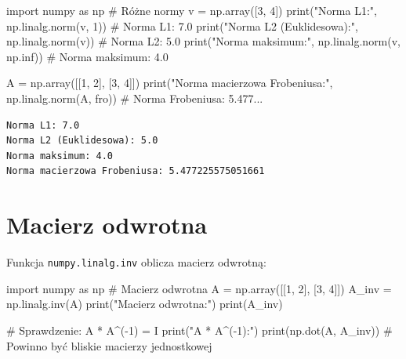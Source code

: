 \documentclass[
  letterpaper,
  DIV=11,
  numbers=noendperiod]{scrreprt}
\newenvironment{Shaded}{\begin{snugshade}}{\end{snugshade}}
\newcommand{\BuiltInTok}[1]{\textcolor[rgb]{0.00,0.23,0.31}{#1}}
\newcommand{\CommentTok}[1]{\textcolor[rgb]{0.37,0.37,0.37}{#1}}
\newcommand{\DecValTok}[1]{\textcolor[rgb]{0.68,0.00,0.00}{#1}}
\newcommand{\ImportTok}[1]{\textcolor[rgb]{0.00,0.46,0.62}{#1}}
\newcommand{\NormalTok}[1]{\textcolor[rgb]{0.00,0.23,0.31}{#1}}
\newcommand{\OperatorTok}[1]{\textcolor[rgb]{0.37,0.37,0.37}{#1}}
\newcommand{\StringTok}[1]{\textcolor[rgb]{0.13,0.47,0.30}{#1}}
\begin{document}
\begin{Shaded}
\begin{Highlighting}[]
\ImportTok{import}\NormalTok{ numpy }\ImportTok{as}\NormalTok{ np}
\CommentTok{\# Różne normy}
\NormalTok{v }\OperatorTok{=}\NormalTok{ np.array([}\DecValTok{3}\NormalTok{, }\DecValTok{4}\NormalTok{])}
\BuiltInTok{print}\NormalTok{(}\StringTok{"Norma L1:"}\NormalTok{, np.linalg.norm(v, }\DecValTok{1}\NormalTok{))  }\CommentTok{\# Norma L1: 7.0}
\BuiltInTok{print}\NormalTok{(}\StringTok{"Norma L2 (Euklidesowa):"}\NormalTok{, np.linalg.norm(v))  }\CommentTok{\# Norma L2: 5.0}
\BuiltInTok{print}\NormalTok{(}\StringTok{"Norma maksimum:"}\NormalTok{, np.linalg.norm(v, np.inf))  }\CommentTok{\# Norma maksimum: 4.0}

\NormalTok{A }\OperatorTok{=}\NormalTok{ np.array([[}\DecValTok{1}\NormalTok{, }\DecValTok{2}\NormalTok{], [}\DecValTok{3}\NormalTok{, }\DecValTok{4}\NormalTok{]])}
\BuiltInTok{print}\NormalTok{(}\StringTok{"Norma macierzowa Frobeniusa:"}\NormalTok{, np.linalg.norm(A, }\StringTok{\textquotesingle{}fro\textquotesingle{}}\NormalTok{))  }\CommentTok{\# Norma Frobeniusa: 5.477...}
\end{Highlighting}
\end{Shaded}

\begin{verbatim}
Norma L1: 7.0
Norma L2 (Euklidesowa): 5.0
Norma maksimum: 4.0
Norma macierzowa Frobeniusa: 5.477225575051661
\end{verbatim}

\section{Macierz odwrotna}\label{macierz-odwrotna}

Funkcja \texttt{numpy.linalg.inv} oblicza macierz odwrotną:

\begin{Shaded}
\begin{Highlighting}[]
\ImportTok{import}\NormalTok{ numpy }\ImportTok{as}\NormalTok{ np}
\CommentTok{\# Macierz odwrotna}
\NormalTok{A }\OperatorTok{=}\NormalTok{ np.array([[}\DecValTok{1}\NormalTok{, }\DecValTok{2}\NormalTok{], [}\DecValTok{3}\NormalTok{, }\DecValTok{4}\NormalTok{]])}
\NormalTok{A\_inv }\OperatorTok{=}\NormalTok{ np.linalg.inv(A)}
\BuiltInTok{print}\NormalTok{(}\StringTok{"Macierz odwrotna:"}\NormalTok{)}
\BuiltInTok{print}\NormalTok{(A\_inv)}

\CommentTok{\# Sprawdzenie: A * A\^{}({-}1) = I}
\BuiltInTok{print}\NormalTok{(}\StringTok{"A * A\^{}({-}1):"}\NormalTok{)}
\BuiltInTok{print}\NormalTok{(np.dot(A, A\_inv))  }\CommentTok{\# Powinno być bliskie macierzy jednostkowej}
\end{Highlighting}
\end{Shaded}
\end{document}
